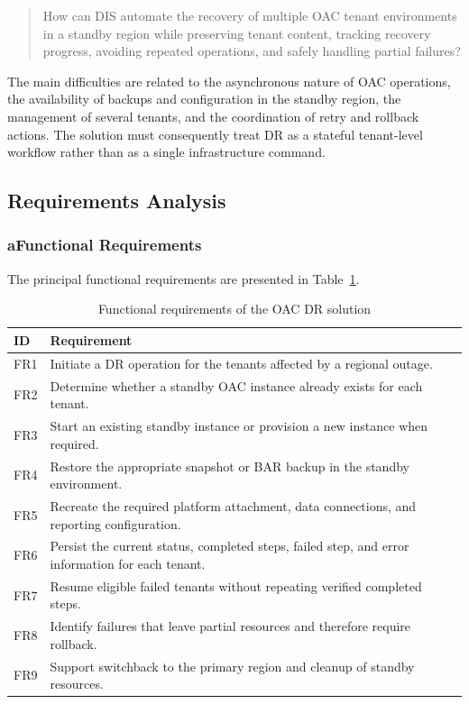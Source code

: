 \begin{quote}
How can DIS automate the recovery of multiple OAC tenant environments in a standby region while preserving tenant content, tracking recovery progress, avoiding repeated operations, and safely handling partial failures?
\end{quote}

The main difficulties are related to the asynchronous nature of OAC operations, the availability of backups and configuration in the standby region, the management of several tenants, and the coordination of retry and rollback actions. The solution must consequently treat DR as a stateful tenant-level workflow rather than as a single infrastructure command.

\subsection{Requirements Analysis}

\subsubsection*{a\quad Functional Requirements}

The principal functional requirements are presented in Table~\ref{tab:dr-functional-requirements}.

\begin{table}[H]
\centering
\caption{Functional requirements of the OAC DR solution}
\label{tab:dr-functional-requirements}
\begin{tabularx}{\textwidth}{@{}p{1.3cm}X@{}}
\toprule
\textbf{ID} & \textbf{Requirement} \\
\midrule
FR1 & Initiate a DR operation for the tenants affected by a regional outage. \\
FR2 & Determine whether a standby OAC instance already exists for each tenant. \\
FR3 & Start an existing standby instance or provision a new instance when required. \\
FR4 & Restore the appropriate snapshot or BAR backup in the standby environment. \\
FR5 & Recreate the required platform attachment, data connections, and reporting configuration. \\
FR6 & Persist the current status, completed steps, failed step, and error information for each tenant. \\
FR7 & Resume eligible failed tenants without repeating verified completed steps. \\
FR8 & Identify failures that leave partial resources and therefore require rollback. \\
FR9 & Support switchback to the primary region and cleanup of standby resources. \\
\bottomrule
\end{tabularx}
\end{table}

